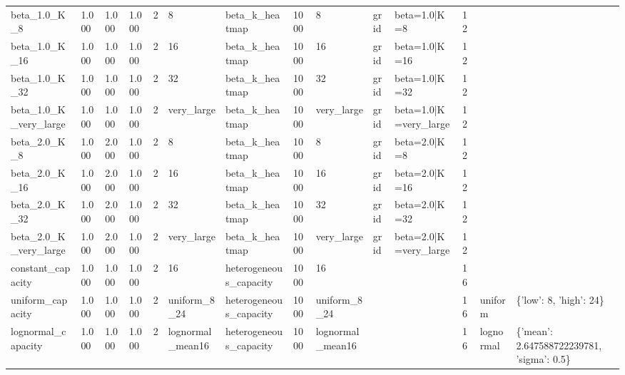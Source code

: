 \begin{tabular}{llllllllllllll}
beta\_1.0\_K\_8 & 1.000 & 1.000 & 1.000 & 2 & 8 & beta\_k\_heatmap & 1000 & 8 & grid & beta=1.0|K=8 & 12 &  &  \\
beta\_1.0\_K\_16 & 1.000 & 1.000 & 1.000 & 2 & 16 & beta\_k\_heatmap & 1000 & 16 & grid & beta=1.0|K=16 & 12 &  &  \\
beta\_1.0\_K\_32 & 1.000 & 1.000 & 1.000 & 2 & 32 & beta\_k\_heatmap & 1000 & 32 & grid & beta=1.0|K=32 & 12 &  &  \\
beta\_1.0\_K\_very\_large & 1.000 & 1.000 & 1.000 & 2 & very\_large & beta\_k\_heatmap & 1000 & very\_large & grid & beta=1.0|K=very\_large & 12 &  &  \\
beta\_2.0\_K\_8 & 1.000 & 2.000 & 1.000 & 2 & 8 & beta\_k\_heatmap & 1000 & 8 & grid & beta=2.0|K=8 & 12 &  &  \\
beta\_2.0\_K\_16 & 1.000 & 2.000 & 1.000 & 2 & 16 & beta\_k\_heatmap & 1000 & 16 & grid & beta=2.0|K=16 & 12 &  &  \\
beta\_2.0\_K\_32 & 1.000 & 2.000 & 1.000 & 2 & 32 & beta\_k\_heatmap & 1000 & 32 & grid & beta=2.0|K=32 & 12 &  &  \\
beta\_2.0\_K\_very\_large & 1.000 & 2.000 & 1.000 & 2 & very\_large & beta\_k\_heatmap & 1000 & very\_large & grid & beta=2.0|K=very\_large & 12 &  &  \\
constant\_capacity & 1.000 & 1.000 & 1.000 & 2 & 16 & heterogeneous\_capacity & 1000 & 16 &  &  & 16 &  &  \\
uniform\_capacity & 1.000 & 1.000 & 1.000 & 2 & uniform\_8\_24 & heterogeneous\_capacity & 1000 & uniform\_8\_24 &  &  & 16 & uniform & \{'low': 8, 'high': 24\} \\
lognormal\_capacity & 1.000 & 1.000 & 1.000 & 2 & lognormal\_mean16 & heterogeneous\_capacity & 1000 & lognormal\_mean16 &  &  & 16 & lognormal & \{'mean': 2.647588722239781, 'sigma': 0.5\} \\
\bottomrule
\end{tabular}
